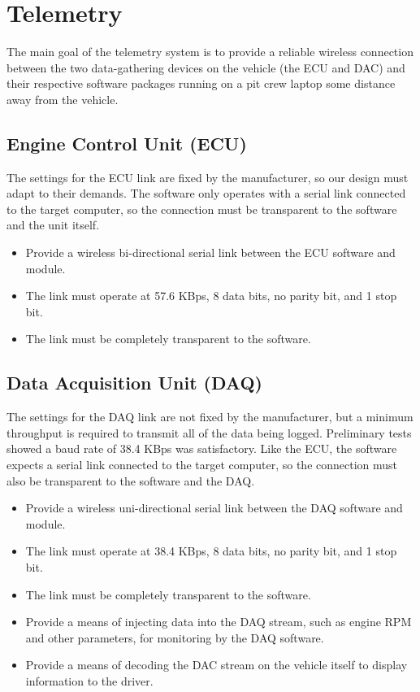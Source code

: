 \section{Telemetry\label{sec:goals_telemetry}}

The main goal of the telemetry system is to provide a reliable wireless connection between the two data-gathering devices on the vehicle (the ECU and DAC) and their respective software packages running on a pit crew laptop some distance away from the vehicle. 

\subsection{Engine Control Unit (ECU) \label{sec:goals_telemetry_ecu}}

The settings for the ECU link are fixed by the manufacturer, so our design must adapt to their demands. The software only operates with a serial link connected to the target computer, so the connection must be transparent to the software and the unit itself.

\begin{itemize}

\item Provide a wireless bi-directional serial link between the ECU software and module.
\item The link must operate at 57.6 KBps, 8 data bits, no parity bit, and 1 stop bit.
\item The link must be completely transparent to the software.

\end{itemize}

\subsection{Data Acquisition Unit (DAQ) \label{sec:goals_telemetry_dac}}

The settings for the DAQ link are not fixed by the manufacturer, but a minimum throughput is required to transmit all of the data being logged. Preliminary tests showed a baud rate of 38.4 KBps was satisfactory. Like the ECU, the software expects a serial link connected to the target computer, so the connection must also be transparent to the software and the DAQ.

\begin{itemize}

\item Provide a wireless uni-directional serial link between the DAQ software and module.
\item The link must operate at 38.4 KBps, 8 data bits, no parity bit, and 1 stop bit.
\item The link must be completely transparent to the software.
\item Provide a means of injecting data into the DAQ stream, such as engine RPM and other parameters, for monitoring by the DAQ software.
\item Provide a means of decoding the DAC stream on the vehicle itself to display information to the driver.

\end{itemize}

